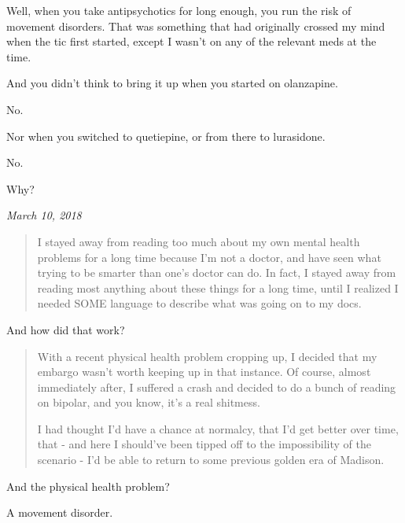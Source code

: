 \begin{paracol}{2}
\begin{leftcolumn}
Well, when you take antipsychotics for long enough, you run the risk of movement disorders. That was something that had originally crossed my mind when the tic first started, except I wasn't on any of the relevant meds at the time.

\begin{ally}
And you didn't think to bring it up when you started on olanzapine.
\end{ally}
No.

\begin{ally}
Nor when you switched to quetiepine, or from there to lurasidone.
\end{ally}
No.

\begin{ally}
Why?
\end{ally}
\end{leftcolumn}
\begin{rightcolumn*}
  \emph{March 10, 2018}
\end{rightcolumn*}
\begin{leftcolumn}
\begin{quotation}
  \noindent I stayed away from reading too much about my own mental health problems for a long time because I'm not a doctor, and have seen what trying to be smarter than one's doctor can do. In fact, I stayed away from reading most anything about these things for a long time, until I realized I needed SOME language to describe what was going on to my docs.
\end{quotation}

\begin{ally}
And how did that work?
\end{ally}

\begin{quotation}
  \noindent With a recent physical health problem cropping up, I decided that my embargo wasn't worth keeping up in that instance. Of course, almost immediately after, I suffered a crash and decided to do a bunch of reading on bipolar, and you know, it's a real shitmess.

  I had thought I'd have a chance at normalcy, that I'd get better over time, that - and here I should've been tipped off to the impossibility of the scenario - I'd be able to return to some previous golden era of Madison.
\end{quotation}

\begin{ally}
And the physical health problem?
\end{ally}
A movement disorder.
\newpage


\end{leftcolumn}
\end{paracol}
